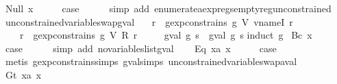 \begin{isabellebody}
\ {\isacharparenleft}Null\ x{\isacharparenright}\isanewline
\ \ \isamarkupfalse%
\ \isamarkupfalse%
\ {\isacharquery}case\isanewline
\ \ \ \ \isamarkupfalse%
\ {\isacharparenleft}simp\ add{\isacharcolon}\ enumerate{\isacharunderscore}aexp{\isacharunderscore}regs{\isacharunderscore}empty{\isacharunderscore}reg{\isacharunderscore}unconstrained{\isacharparenright}\isanewline
{}\isamarkupfalse%
%
\endisatagproof
{\isafoldproof}%
%
\isadelimproof
\isanewline
%
\endisadelimproof
\isanewline
{}\isamarkupfalse%
\ unconstrained{\isacharunderscore}variable{\isacharunderscore}swap{\isacharunderscore}gval{\isacharcolon}\isanewline
\ \ \ {\isachardoublequoteopen}{\isasymforall}r{\isachardot}\ {\isasymnot}\ gexp{\isacharunderscore}constrains\ g\ {\isacharparenleft}V\ {\isacharparenleft}vname{\isachardot}I\ r{\isacharparenright}{\isacharparenright}\ {\isasymLongrightarrow}\isanewline
\ \ \ \ {\isasymforall}r{\isachardot}\ {\isasymnot}\ gexp{\isacharunderscore}constrains\ g\ {\isacharparenleft}V\ {\isacharparenleft}R\ r{\isacharparenright}{\isacharparenright}\ {\isasymLongrightarrow}\isanewline
\ \ \ \ gval\ g\ s\ {\isacharequal}\ gval\ g\ s{\isacharprime}{\isachardoublequoteclose}\isanewline
%
\isadelimproof
%
\endisadelimproof
%
\isatagproof
{}\isamarkupfalse%
{\isacharparenleft}induct\ g{\isacharparenright}\isanewline
{}\isamarkupfalse%
\ {\isacharparenleft}Bc\ x{\isacharparenright}\isanewline
\ \ \isamarkupfalse%
\ \isamarkupfalse%
\ {\isacharquery}case\isanewline
\ \ \ \ \isamarkupfalse%
\ {\isacharparenleft}simp\ add{\isacharcolon}\ no{\isacharunderscore}variables{\isacharunderscore}list{\isacharunderscore}gval{\isacharparenright}\isanewline
{}\isamarkupfalse%
\isanewline
\ \ \isamarkupfalse%
\ {\isacharparenleft}Eq\ x{}a\ x{}{\isacharparenright}\isanewline
\ \ \isamarkupfalse%
\ \isamarkupfalse%
\ {\isacharquery}case\isanewline
\ \ \ \ \isamarkupfalse%
\ {\isacharparenleft}metis\ gexp{\isacharunderscore}constrains{\isachardot}simps{\isacharparenleft}{}{\isacharparenright}\ gval{\isachardot}simps{\isacharparenleft}{}{\isacharparenright}\ unconstrained{\isacharunderscore}variable{\isacharunderscore}swap{\isacharunderscore}aval{\isacharparenright}\isanewline
{}\isamarkupfalse%
\isanewline
\ \ \isamarkupfalse%
\ {\isacharparenleft}Gt\ x{}a\ x{}{\isacharparenright}\isanewline

\end{isabellebody}
